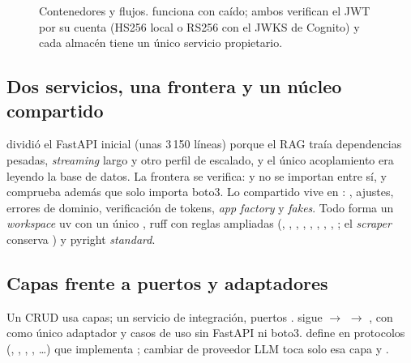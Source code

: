 \begin{figure}[tb]
\caption{Contenedores y flujos.  funciona con  caído; ambos
verifican el JWT por su cuenta (HS256 local o RS256 con el JWKS de Cognito) y cada almacén tiene
un único servicio propietario.}
\label{fig:04-contenedores}
\end{figure}

\subsection{Dos servicios, una frontera y un núcleo compartido}

 dividió el FastAPI inicial (unas 3\,150 líneas) porque el RAG traía dependencias
pesadas, \emph{streaming} largo y otro perfil de escalado, y el único acoplamiento era
 leyendo la base de datos. La frontera se verifica:
 y  no se importan entre sí, y
 comprueba además que solo 
importa boto3. Lo compartido vive en : , ajustes, errores de
dominio, verificación de tokens, \emph{app factory} y \emph{fakes}. Todo forma un \emph{workspace} uv con un único , ruff con reglas ampliadas
(, , , , , , ,
, ; el \emph{scraper} conserva ) y pyright \emph{standard}.

\subsection{Capas frente a puertos y adaptadores}

Un CRUD usa capas; un servicio de integración, puertos \cite{sw:hexagonal}.
 sigue  $\rightarrow$  $\rightarrow$ , con
 como único adaptador y casos de uso sin FastAPI ni boto3.
 define en  protocolos (, ,
, , \dots) que implementa ; cambiar de
proveedor LLM toca solo esa capa y .

